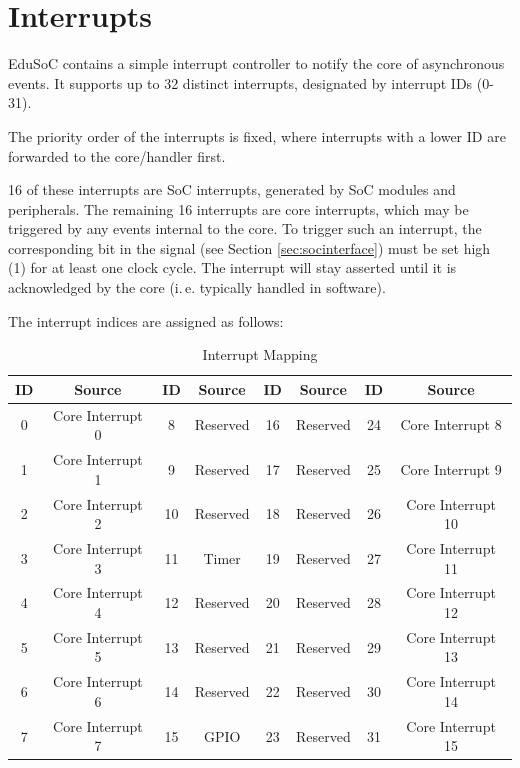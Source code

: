 \newpage
\section{Interrupts}\label{sec:interrupts}
EduSoC contains a simple interrupt controller to notify the core of asynchronous events. It supports up to 32 distinct interrupts, designated by interrupt IDs (0-31).

The priority order of the interrupts is fixed, where interrupts with a lower ID are forwarded to the core/handler first.

16 of these interrupts are SoC interrupts, generated by SoC modules and peripherals. The remaining 16 interrupts are core interrupts, which may be triggered by any events internal to the core.
To trigger such an interrupt, the corresponding bit in the  signal (see Section \ref{sec:socinterface}) must be set high (1) for at least one clock cycle. The interrupt will stay asserted until it is acknowledged by the core (i.\,e. typically handled in software).

The interrupt indices are assigned as follows:\\
\begin{table}[H]
    \centering
    \begin{tabular}{|c|c||c|c||c|c||c|c|}\hline
        ID & Source & ID & Source & ID & Source & ID & Source \\\hline\hline
        \cellcolor{blue!25}0 & \cellcolor{blue!25}Core Interrupt 0 & 8 & Reserved & 16 & Reserved & \cellcolor{blue!25}24 & \cellcolor{blue!25}Core Interrupt 8 \\
        \cellcolor{blue!25}1 & \cellcolor{blue!25}Core Interrupt 1 & 9 & Reserved & 17 & Reserved & \cellcolor{blue!25}25 & \cellcolor{blue!25}Core Interrupt 9 \\
        \cellcolor{blue!25}2 & \cellcolor{blue!25}Core Interrupt 2 & 10 & Reserved & 18 & Reserved & \cellcolor{blue!25}26 & \cellcolor{blue!25}Core Interrupt 10 \\
        \cellcolor{blue!25}3 & \cellcolor{blue!25}Core Interrupt 3 & \cellcolor{red!25}11 & \cellcolor{red!25}Timer & 19 & Reserved & \cellcolor{blue!25}27 & \cellcolor{blue!25}Core Interrupt 11 \\
        \cellcolor{blue!25}4 & \cellcolor{blue!25}Core Interrupt 4 & 12 & Reserved & 20 & Reserved & \cellcolor{blue!25}28 & \cellcolor{blue!25}Core Interrupt 12 \\
        \cellcolor{blue!25}5 & \cellcolor{blue!25}Core Interrupt 5 & 13 & Reserved & 21 & Reserved & \cellcolor{blue!25}29 & \cellcolor{blue!25}Core Interrupt 13 \\
        \cellcolor{blue!25}6 & \cellcolor{blue!25}Core Interrupt 6 & 14 & Reserved & 22 & Reserved & \cellcolor{blue!25}30 & \cellcolor{blue!25}Core Interrupt 14 \\
        \cellcolor{blue!25}7 & \cellcolor{blue!25}Core Interrupt 7 & \cellcolor{green!25}15 & \cellcolor{green!25}GPIO & 23 & Reserved & \cellcolor{blue!25}31 & \cellcolor{blue!25}Core Interrupt 15 \\\hline
    \end{tabular}
    \caption{Interrupt Mapping}
    \label{tab:interrupts}
\end{table}

